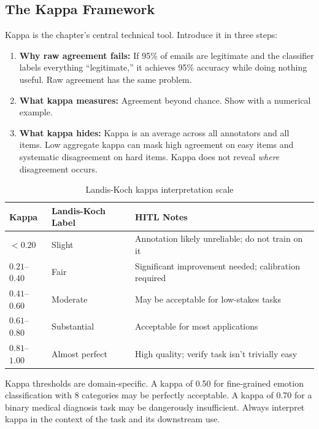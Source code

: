 \subsection{The Kappa Framework}

Kappa is the chapter's central technical tool. Introduce it in three steps:

\begin{enumerate}
    \item \textbf{Why raw agreement fails:} If 95\% of emails are legitimate and the classifier labels everything ``legitimate,'' it achieves 95\% accuracy while doing nothing useful. Raw agreement has the same problem.
    \item \textbf{What kappa measures:} Agreement beyond chance. Show with a numerical example.
    \item \textbf{What kappa hides:} Kappa is an average across all annotators and all items. Low aggregate kappa can mask high agreement on easy items and systematic disagreement on hard items. Kappa does not reveal \emph{where} disagreement occurs.
\end{enumerate}

\begin{table}[htbp]
\caption{Landis-Koch kappa interpretation scale}
\label{tab:kappa-scale-ch07}
\centering
\begin{tabular}{@{}p{2cm}p{5cm}p{4.5cm}@{}}
\toprule
\textbf{Kappa} & \textbf{Landis-Koch Label} & \textbf{HITL Notes} \\
\midrule
$< 0.20$ & Slight & Annotation likely unreliable; do not train on it \\
$0.21$--$0.40$ & Fair & Significant improvement needed; calibration required \\
$0.41$--$0.60$ & Moderate & May be acceptable for low-stakes tasks \\
$0.61$--$0.80$ & Substantial & Acceptable for most applications \\
$0.81$--$1.00$ & Almost perfect & High quality; verify task isn't trivially easy \\
\bottomrule
\end{tabular}
\end{table}

\begin{cautionbox}
Kappa thresholds are domain-specific. A kappa of 0.50 for fine-grained emotion classification with 8 categories may be perfectly acceptable. A kappa of 0.70 for a binary medical diagnosis task may be dangerously insufficient. Always interpret kappa in the context of the task and its downstream use.
\end{cautionbox}

